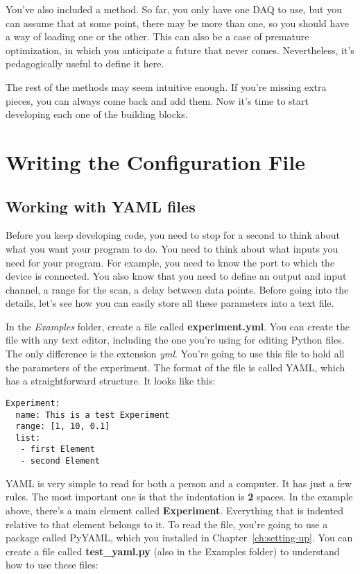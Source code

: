 You've also included a  method. So far, you only have one DAQ to use, but you can assume that at some point, there may be more than one, so you should have a way of loading one or the other. This can also be a case of premature optimization, in which you anticipate a future that never comes. Nevertheless, it's pedagogically useful to define it here.

The rest of the methods may seem intuitive enough. If you're missing extra pieces, you can always come back and add them. Now it's time to start developing each one of the building blocks.

\section{Writing the Configuration File}\label{sec:configuration-file}
\subsection{Working with YAML files}\label{subsec:yaml-files}
Before you keep developing code, you need to stop for a second to think about what you want your program to do. You need to think about what inputs you need for your program. For example, you need to know the port to which the device is connected. You also know that you need to define an output and input channel, a range for the scan, a delay between data points. Before going into the details, let's see how you can easily store all these parameters into a text file.

In the \emph{Examples} folder, create a file called \textbf{experiment.yml}. You can create the file with any text editor, including the one you're using for editing Python files. The only difference is the extension \emph{yml}. You're going to use this file to hold all the parameters of the experiment. The format of the file is called {YAML}, which has a straightforward structure. It looks like this:

\begin{verbatim}
Experiment:
  name: This is a test Experiment
  range: [1, 10, 0.1]
  list:
   - first Element
   - second Element
\end{verbatim}

{YAML} is very simple to read for both a person and a computer. It has just a few rules. The most important one is that the indentation is \textbf{2} spaces. In the example above, there's a main element called \textbf{Experiment}. Everything that is indented relative to that element belongs to it. To read the file, you're going to use a package called PyYAML, which you installed in Chapter~\ref{ch:setting-up}. You can create a file called \textbf{test\_yaml.py} (also in the Examples folder) to understand how to use these files:

